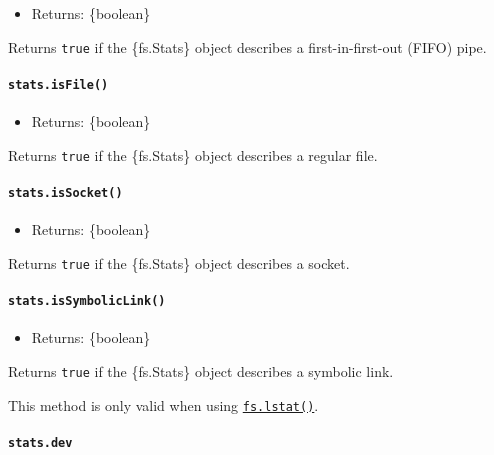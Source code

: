 \begin{itemize}
\tightlist
\item
  Returns: \{boolean\}
\end{itemize}

Returns \texttt{true} if the \{fs.Stats\} object describes a
first-in-first-out (FIFO) pipe.

\paragraph{\texorpdfstring{\texttt{stats.isFile()}}{stats.isFile()}}\label{stats.isfile}

\begin{itemize}
\tightlist
\item
  Returns: \{boolean\}
\end{itemize}

Returns \texttt{true} if the \{fs.Stats\} object describes a regular
file.

\paragraph{\texorpdfstring{\texttt{stats.isSocket()}}{stats.isSocket()}}\label{stats.issocket}

\begin{itemize}
\tightlist
\item
  Returns: \{boolean\}
\end{itemize}

Returns \texttt{true} if the \{fs.Stats\} object describes a socket.

\paragraph{\texorpdfstring{\texttt{stats.isSymbolicLink()}}{stats.isSymbolicLink()}}\label{stats.issymboliclink}

\begin{itemize}
\tightlist
\item
  Returns: \{boolean\}
\end{itemize}

Returns \texttt{true} if the \{fs.Stats\} object describes a symbolic
link.

This method is only valid when using
\hyperref[fslstatpath-options-callback]{\texttt{fs.lstat()}}.

\paragraph{\texorpdfstring{\texttt{stats.dev}}{stats.dev}}\label{stats.dev}

